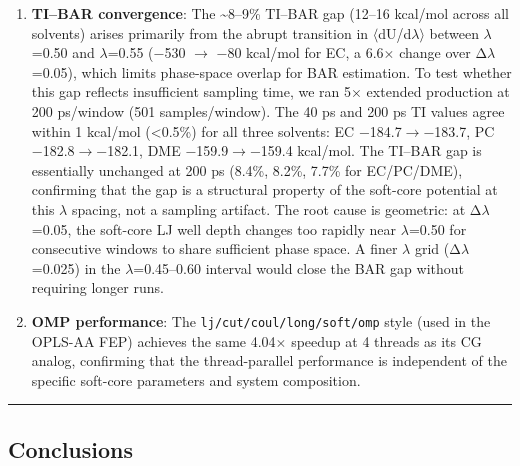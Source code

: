 \documentclass[
  11pt,
]{article}
\begin{document}
\begin{enumerate}
\def\labelenumi{\arabic{enumi}.}
\setcounter{enumi}{2}
\item
  \textbf{TI--BAR convergence}: The \textasciitilde8--9\% TI--BAR gap
  (12--16 kcal/mol across all solvents) arises primarily from the abrupt
  transition in \(\langle\)dU/d\(\lambda\)\(\rangle\) between
  \(\lambda\)=0.50 and \(\lambda\)=0.55 (−530 \(\rightarrow\) −80
  kcal/mol for EC, a 6.6\(\times\) change over Δ\(\lambda\)=0.05), which
  limits phase-space overlap for BAR estimation. To test whether this
  gap reflects insufficient sampling time, we ran 5\(\times\) extended
  production at 200 ps/window (501 samples/window). The 40 ps and 200 ps
  TI values agree within 1 kcal/mol (\textless0.5\%) for all three
  solvents: EC −184.7\(\rightarrow\)−183.7, PC
  −182.8\(\rightarrow\)−182.1, DME −159.9\(\rightarrow\)−159.4 kcal/mol.
  The TI--BAR gap is essentially unchanged at 200 ps (8.4\%, 8.2\%,
  7.7\% for EC/PC/DME), confirming that the gap is a structural property
  of the soft-core potential at this \(\lambda\) spacing, not a sampling
  artifact. The root cause is geometric: at Δ\(\lambda\)=0.05, the
  soft-core LJ well depth changes too rapidly near \(\lambda\)=0.50 for
  consecutive windows to share sufficient phase space. A finer
  \(\lambda\) grid (Δ\(\lambda\)=0.025) in the \(\lambda\)=0.45--0.60
  interval would close the BAR gap without requiring longer runs.
\item
  \textbf{OMP performance}: The \texttt{lj/cut/coul/long/soft/omp} style
  (used in the OPLS-AA FEP) achieves the same 4.04\(\times\) speedup at
  4 threads as its CG analog, confirming that the thread-parallel
  performance is independent of the specific soft-core parameters and
  system composition.
\end{enumerate}

\begin{center}\rule{0.5\linewidth}{0.5pt}\end{center}

\subsection{Conclusions}\label{conclusions}
\end{document}
